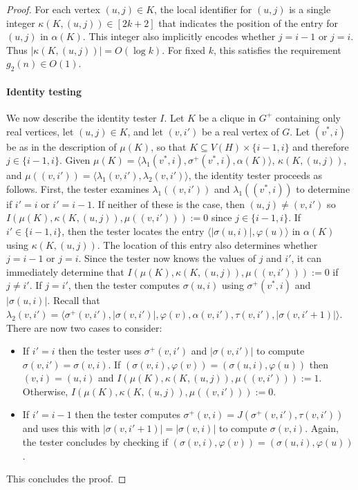 \documentclass{patmorin}
\newcommand{\Oh}{O}
\begin{document}
\begin{proof}
    For each vertex $(u,j)\in K$, the local identifier for $(u,j)$ is a single integer $\kappa(K,(u,j))\in[2k+2]$ that indicates the position of the entry for $(u,j)$ in $\alpha(K)$.  This integer also implicitly encodes whether $j=i-1$  or $j=i$.  Thus $|\kappa(K,(u,j))| = \Oh(\log k)$.  For fixed $k$, this satisfies the requirement $g_2(n)\in\Oh(1)$.

    \paragraph{Identity testing}

    We now describe the identity tester $I$.  Let $K$ be a clique in $G^+$ containing only real vertices, let $(u,j)\in K$, and let $(v,i')$ be a real vertex of $G$.  Let $(v^*,i)$ be as in the description of $\mu(K)$, so that $K\subseteq V(H)\times\{i-1,i\}$ and therefore $j\in\{i-1,i\}$.   Given $\mu(K)=\langle\lambda_1(v^*,i),\sigma^+(v^*,i),\alpha(K)\rangle$, $\kappa(K,(u,j))$, and $\mu((v,i'))=\langle \lambda_1(v,i'),\lambda_2(v,i')\rangle$, the identity tester proceeds as follows. First, the tester examines $\lambda_1((v,i'))$ and $\lambda_1((v^*,i))$ to determine if $i'=i$ or $i'=i-1$.  If neither of these is the case, then $(u,j)\neq (v,i')$ so $I(\mu(K),\kappa(K,(u,j)),\mu((v,i'))):=0$ since $j\in\{i-1,i\}$.
    If $i'\in\{i-1,i\}$, then the tester locates the entry $\langle |\sigma(u,i)|,\varphi(u)\rangle$ in $\alpha(K)$ using $\kappa(K,(u,j))$. The location of this entry also determines whether $j=i-1$ or $j=i$.  Since the tester now knows the values of $j$ and $i'$, it can immediately determine that $I(\mu(K),\kappa(K,(u,j)),\mu((v,i'))):=0$ if $j\neq i'$.
    If $j=i'$, then the tester computes $\sigma(u,i)$ using $\sigma^+(v^*,i)$ and $|\sigma(u,i)|$. Recall that $\lambda_2(v,i')=\langle \sigma^+(v,i'), |\sigma(v,i')|, \varphi(v),\alpha(v,i'),\tau(v,i'),|\sigma(v,i'+1)|\rangle$.
  There are now two cases to consider:
  \begin{itemize}
    \item If $i'=i$ then the tester uses $\sigma^+(v,i')$ and $|\sigma(v,i')|$ to compute $\sigma(v,i')=\sigma(v,i)$.  If $(\sigma(v,i),\varphi(v))=(\sigma(u,i),\varphi(u))$ then $(v,i)=(u,i)$ and  $I(\mu(K),\kappa(K,(u,j)),\mu((v,i'))):=1$.  Otherwise, $I(\mu(K),\kappa(K,(u,j)),\mu((v,i'))):=0$.
    \item If $i'=i-1$ then the tester computes $\sigma^+(v,i)=J(\sigma^+(v,i'),\tau(v,i'))$ and uses this with $|\sigma(v,i'+1)|=|\sigma(v,i)|$ to compute $\sigma(v,i)$.  Again, the tester concludes by checking if $(\sigma(v,i),\varphi(v))=(\sigma(u,i),\varphi(u))$.
  \end{itemize}
  This concludes the proof.
\end{proof}

\end{document}
